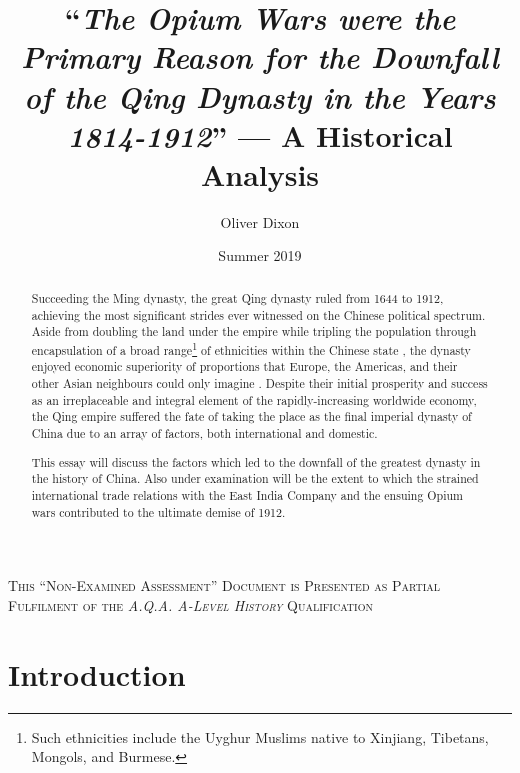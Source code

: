 \documentclass{article}
\title{``\emph{The Opium Wars were the Primary Reason for the Downfall of the Qing Dynasty in the Years 1814-1912}'' --- A Historical Analysis}
\author{Oliver Dixon}
\date{Summer 2019}
\newcommand{\textrule}{\noindent\makebox[\linewidth]{\rule{\linewidth}{0.4pt}}}
\begin{document}
\clearpage\maketitle
\thispagestyle{titlehdr}
\pagestyle{stdhdr}

\vspace*{-1.5em}
\begin{figure}[h!]
	\centering
	\def\svgwidth{0.5\linewidth}
	
\end{figure}
\vspace*{-0.5em}

\begin{abstract}

	Succeeding the Ming dynasty, the great Qing dynasty ruled from 1644 to 1912, achieving the most significant strides ever witnessed on the Chinese political spectrum. Aside from doubling the land under the empire
	\autocite{Turchin:2006} while tripling the population through encapsulation of a broad range\footnote{Such ethnicities include the Uyghur Muslims native to Xinjiang, Tibetans, Mongols, and Burmese.} of ethnicities within the Chinese state
	\autocite{Rowe:2012}, the dynasty enjoyed economic superiority of proportions that Europe, the Americas, and their other Asian neighbours could only imagine 
	\autocite{Maddison:2007}. Despite their initial prosperity and success as an irreplaceable and integral element of the rapidly-increasing worldwide economy, the Qing empire suffered the fate of taking the place as the final imperial dynasty of China due to an array of factors, both international and domestic.

	This essay will discuss the factors which led to the downfall of the greatest dynasty in the history of China. Also under examination will be the extent to which the strained international trade relations with the East India Company and the ensuing Opium wars contributed to the ultimate demise of 1912.

\end{abstract}

\textrule
\vspace*{0.6em}
{\centering \textsc{This ``Non-Examined Assessment'' Document is Presented as Partial Fulfilment of the \textit{A.Q.A. A-Level History} Qualification}\\}
\textrule

\section{Introduction}
\end{document}

